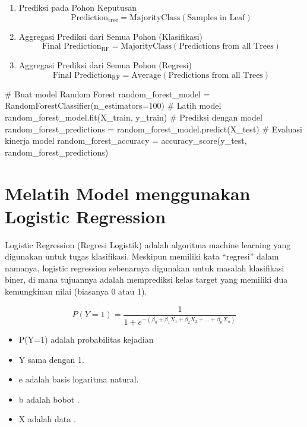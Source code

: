 \documentclass[
  letterpaper,
]{krantz}
\makeatletter
\newenvironment{Shaded}{\begin{snugshade}}{\end{snugshade}}
\newcommand{\CommentTok}[1]{\textcolor[rgb]{0.37,0.37,0.37}{#1}}
\newcommand{\DecValTok}[1]{\textcolor[rgb]{0.68,0.00,0.00}{#1}}
\newcommand{\NormalTok}[1]{\textcolor[rgb]{0.00,0.23,0.31}{#1}}
\newcommand{\OperatorTok}[1]{\textcolor[rgb]{0.37,0.37,0.37}{#1}}
\providecommand{\tightlist}{%
  \setlength{\itemsep}{0pt}\setlength{\parskip}{0pt}}\usepackage{longtable,booktabs,array}
\newenvironment{kframe}{%
\medskip{}
\setlength{\fboxsep}{.8em}
 \def\at@end@of@kframe{}%
 \ifinner\ifhmode%
  \def\at@end@of@kframe{\end{minipage}}%
  \begin{minipage}{\columnwidth}%
 \fi\fi%
 \def\FrameCommand##1{\hskip\@totalleftmargin \hskip-\fboxsep
 \colorbox{shadecolor}{##1}\hskip-\fboxsep
     \hskip-\linewidth \hskip-\@totalleftmargin \hskip\columnwidth}%
 \MakeFramed {\advance\hsize-\width
   \@totalleftmargin\z@ \linewidth\hsize
   \@setminipage}}%
 {\par\unskip\endMakeFramed%
 \at@end@of@kframe}
\renewenvironment{Shaded}{\begin{kframe}}{\end{kframe}}
\makeatother
\begin{document}
\begin{enumerate}
\def\labelenumi{\arabic{enumi}.}
\item
  Prediksi pada Pohon Keputusan \[
  \text{Prediction}_{\text{tree}} = \text{MajorityClass}(\text{Samples in Leaf})
  \]
\item
  Aggregasi Prediksi dari Semua Pohon (Klasifikasi) \[
  \text{Final Prediction}_{\text{RF}} = \text{MajorityClass}(\text{Predictions from all Trees})
  \]
\item
  Aggregasi Prediksi dari Semua Pohon (Regresi) \[
  \text{Final Prediction}_{\text{RF}} = \text{Average}(\text{Predictions from all Trees})
  \]
\end{enumerate}

\begin{Shaded}
\begin{Highlighting}[]

\CommentTok{\# Buat model Random Forest}
\NormalTok{random\_forest\_model }\OperatorTok{=}\NormalTok{ RandomForestClassifier(n\_estimators}\OperatorTok{=}\DecValTok{100}\NormalTok{)}
\CommentTok{\# Latih model}
\NormalTok{random\_forest\_model.fit(X\_train, y\_train)}
\CommentTok{\# Prediksi dengan model}
\NormalTok{random\_forest\_predictions }\OperatorTok{=}\NormalTok{ random\_forest\_model.predict(X\_test)}
\CommentTok{\# Evaluasi kinerja model}
\NormalTok{random\_forest\_accuracy }\OperatorTok{=}\NormalTok{ accuracy\_score(y\_test, random\_forest\_predictions)}
\end{Highlighting}
\end{Shaded}

\hypertarget{melatih-model-menggunakan-logistic-regression}{%
\section{Melatih Model menggunakan Logistic
Regression}\label{melatih-model-menggunakan-logistic-regression}}

Logistic Regression (Regresi Logistik) adalah algoritma machine learning
yang digunakan untuk tugas klasifikasi. Meskipun memiliki kata
``regresi'' dalam namanya, logistic regression sebenarnya digunakan
untuk masalah klasifikasi biner, di mana tujuannya adalah memprediksi
kelas target yang memiliki dua kemungkinan nilai (biasanya 0 atau 1).

\[
P(Y=1) = \frac{1}{1 + e^{-(\beta_0 + \beta_1 X_1 + \beta_2 X_2 + \ldots + \beta_n X_n)}}
\]

\begin{itemize}
\tightlist
\item
  P(Y=1) adalah probabilitas kejadian
\item
  Y sama dengan 1.
\item
  e adalah basis logaritma natural.
\item
  b adalah bobot .
\item
  X adalah data .
\end{itemize}
\end{document}
